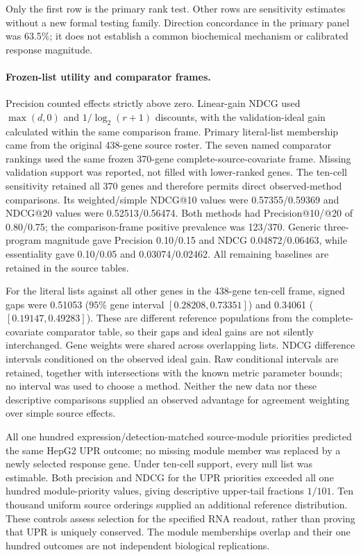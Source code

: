 \documentclass[a4paper,fleqn]{cas-sc}
\makeatletter
\DeclareRobustCommand{\rev}[1]{{\color{red}\def\@citecolor{black}\def\@linkcolor{red}\def\@urlcolor{red}#1}}
\makeatother
\begin{document}
\rev{Only the first row is the primary rank test.} \rev{Other rows are sensitivity estimates without a new formal testing family.} \rev{Direction concordance in the primary panel was 63.5\%; it does not establish a common biochemical mechanism or calibrated response magnitude.}

\paragraph{\rev{Frozen-list utility and comparator frames.}}
\rev{Precision counted effects strictly above zero.} \rev{Linear-gain NDCG used $\max(d,0)$ and $1/\log_2(r+1)$ discounts, with the validation-ideal gain calculated within the same comparison frame.} \rev{Primary literal-list membership came from the original 438-gene source roster.} \rev{The seven named comparator rankings used the same frozen 370-gene complete-source-covariate frame.} \rev{Missing validation support was reported, not filled with lower-ranked genes.} \rev{The ten-cell sensitivity retained all 370 genes and therefore permits direct observed-method comparisons.} \rev{Its weighted/simple NDCG@10 values were 0.57355/0.59369 and NDCG@20 values were 0.52513/0.56474.} \rev{Both methods had Precision@10/@20 of 0.80/0.75; the comparison-frame positive prevalence was 123/370.} \rev{Generic three-program magnitude gave Precision 0.10/0.15 and NDCG 0.04872/0.06463, while essentiality gave 0.10/0.05 and 0.03074/0.02462.} \rev{All remaining baselines are retained in the source tables.}

\rev{For the literal lists against all other genes in the 438-gene ten-cell frame, signed gaps were 0.51053 ($95\%$ gene interval $[0.28208,0.73351]$) and 0.34061 ($[0.19147,0.49283]$).} \rev{These are different reference populations from the complete-covariate comparator table, so their gaps and ideal gains are not silently interchanged.} \rev{Gene weights were shared across overlapping lists.} \rev{NDCG difference intervals conditioned on the observed ideal gain.} \rev{Raw conditional intervals are retained, together with intersections with the known metric parameter bounds; no interval was used to choose a method.} \rev{Neither the new data nor these descriptive comparisons supplied an observed advantage for agreement weighting over simple source effects.}

\rev{All one hundred expression/detection-matched source-module priorities predicted the same HepG2 UPR outcome; no missing module member was replaced by a newly selected response gene.} \rev{Under ten-cell support, every null list was estimable.} \rev{Both precision and NDCG for the UPR priorities exceeded all one hundred module-priority values, giving descriptive upper-tail fractions $1/101$.} \rev{Ten thousand uniform source orderings supplied an additional reference distribution.} \rev{These controls assess selection for the specified RNA readout, rather than proving that UPR is uniquely conserved.} \rev{The module memberships overlap and their one hundred outcomes are not independent biological replications.}
\end{document}
